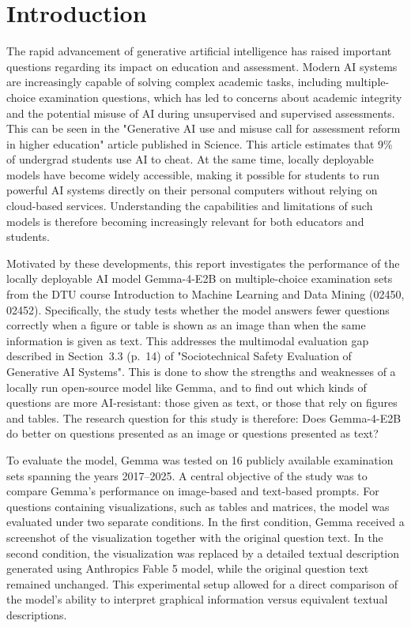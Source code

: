 \documentclass{article}
\begin{document}
\section{Introduction}
The rapid advancement of generative artificial intelligence has raised important questions regarding its impact on education and assessment. Modern AI systems are increasingly capable of solving complex academic tasks, including multiple-choice examination questions, which has led to concerns about academic integrity and the potential misuse of AI during unsupervised and supervised assessments. This can be seen in the "Generative AI use and misuse call for assessment reform in higher education"\supercite{chirikov2026genai} article published in Science. This article estimates that 9\% of undergrad students use AI to cheat. At the same time, locally deployable models have become widely accessible, making it possible for students to run powerful AI systems directly on their personal computers without relying on cloud-based services. Understanding the capabilities and limitations of such models is therefore becoming increasingly relevant for both educators and students.

Motivated by these developments, this report investigates the performance of the locally deployable AI model Gemma-4-E2B on multiple-choice examination sets from the DTU course Introduction to Machine Learning and Data Mining (02450, 02452). Specifically, the study tests whether the model answers fewer questions correctly when a figure or table is shown as an image than when the same information is given as text. This addresses the multimodal evaluation gap described in Section~3.3 (p.~14) of "Sociotechnical Safety Evaluation of Generative AI Systems"\supercite{weidinger2023sociotechnical}. This is done to show the strengths and weaknesses of a locally run open-source model like Gemma, and to find out which kinds of questions are more AI-resistant: those given as text, or those that rely on figures and tables. The research question for this study is therefore: Does Gemma-4-E2B do better on questions presented as an image or questions presented as text?

To evaluate the model, Gemma was tested on 16 publicly available examination sets spanning the years 2017–2025. A central objective of the study was to compare Gemma's performance on image-based and text-based prompts. For questions containing visualizations, such as tables and matrices, the model was evaluated under two separate conditions. In the first condition, Gemma received a screenshot of the visualization together with the original question text. In the second condition, the visualization was replaced by a detailed textual description generated using Anthropics Fable 5 model, while the original question text remained unchanged. This experimental setup allowed for a direct comparison of the model's ability to interpret graphical information versus equivalent textual descriptions.
\end{document}
